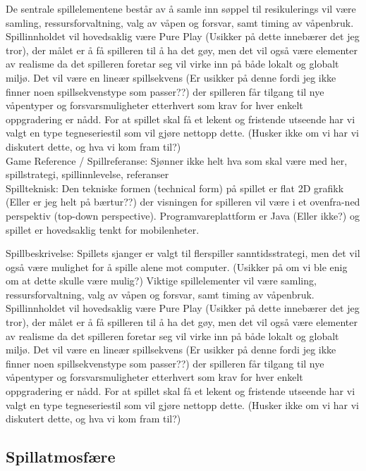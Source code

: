 De sentrale spillelementene består av å samle inn søppel til resikulerings vil være samling, ressursforvaltning, valg av våpen og forsvar, samt timing av våpenbruk. Spillinnholdet vil hovedsaklig være Pure Play (Usikker på dette innebærer det jeg tror), der målet er å få spilleren til å ha det gøy, men det vil også være elementer av realisme da det spilleren foretar seg vil virke inn på både lokalt og globalt miljø. Det vil være en lineær spillsekvens (Er usikker på denne fordi jeg ikke finner noen  spillsekvenstype som passer??) der spilleren får tilgang til nye våpentyper og forsvarsmuligheter etterhvert som krav for hver enkelt oppgradering er nådd. For at spillet skal få et lekent og fristende utseende har vi valgt en type tegneseriestil som vil gjøre nettopp dette. (Husker ikke om vi har vi diskutert dette, og hva vi kom fram til?)
\\
Game Reference / Spillreferanse: Sjønner ikke helt hva som skal være med her, spillstrategi, spillinnlevelse, referanser
\\
Spillteknisk: Den tekniske formen (technical form) på spillet er flat 2D grafikk (Eller er jeg helt på bærtur??) der visningen for spilleren vil være i et ovenfra-ned perspektiv (top-down perspective). Programvareplattform er Java (Eller ikke?) og spillet er hovedsaklig tenkt for mobilenheter.

Spillbeskrivelse: Spillets sjanger er valgt til flerspiller sanntidsstrategi, men det vil også være mulighet for å spille alene mot computer. (Usikker på om vi ble enig om at dette skulle være mulig?) Viktige spillelementer vil være samling, ressursforvaltning, valg av våpen og forsvar, samt timing av våpenbruk. Spillinnholdet vil hovedsaklig være Pure Play (Usikker på dette innebærer det jeg tror), der målet er å få spilleren til å ha det gøy, men det vil også være elementer av realisme da det spilleren foretar seg vil virke inn på både lokalt og globalt miljø. Det vil være en lineær spillsekvens (Er usikker på denne fordi jeg ikke finner noen  spillsekvenstype som passer??) der spilleren får tilgang til nye våpentyper og forsvarsmuligheter etterhvert som krav for hver enkelt oppgradering er nådd. For at spillet skal få et lekent og fristende utseende har vi valgt en type tegneseriestil som vil gjøre nettopp dette. (Husker ikke om vi har vi diskutert dette, og hva vi kom fram til?)\\ 


\subsection{Spillatmosfære}

